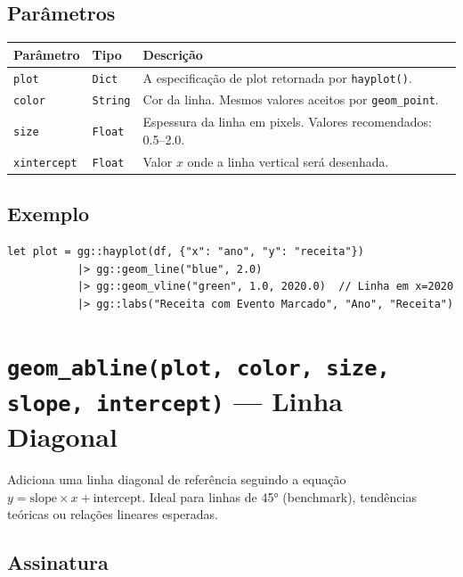 \documentclass[12pt, a4paper, oneside]{book}
\newcommand{\code}[1]{\texttt{#1}}
\begin{document}
\subsection*{Parâmetros}

\begin{tabularx}{\textwidth}{@{}lL{2.5cm}X@{}}
  \toprule
  \textbf{Parâmetro} & \textbf{Tipo} & \textbf{Descrição} \\
  \midrule
  \code{plot}       & \code{Dict}   & A especificação de plot retornada por \code{hayplot()}. \\[4pt]
  \code{color}      & \code{String} & Cor da linha. Mesmos valores aceitos por \code{geom\_point}. \\[4pt]
  \code{size}       & \code{Float}  & Espessura da linha em pixels. Valores recomendados: 0.5--2.0. \\[4pt]
  \code{xintercept} & \code{Float}  & Valor $x$ onde a linha vertical será desenhada. \\
  \bottomrule
\end{tabularx}

\subsection*{Exemplo}

\begin{lstlisting}[caption={Linha vertical de evento}]
let plot = gg::hayplot(df, {"x": "ano", "y": "receita"})
           |> gg::geom_line("blue", 2.0)
           |> gg::geom_vline("green", 1.0, 2020.0)  // Linha em x=2020
           |> gg::labs("Receita com Evento Marcado", "Ano", "Receita")
\end{lstlisting}

\section{\texttt{geom\_abline(plot, color, size, slope, intercept)} --- Linha Diagonal}

Adiciona uma linha diagonal de referência seguindo a equação $y = \text{slope} \times x + \text{intercept}$.
Ideal para linhas de 45° (benchmark), tendências teóricas ou relações lineares esperadas.

\subsection*{Assinatura}
\end{document}
